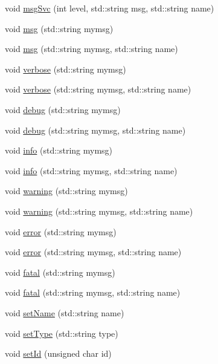 \begin{DoxyCompactItemize}
\item 
void \hyperlink{classObject_a3f9d5537ebce0c0f2bf6ae4d92426f3c}{msgSvc} (int level, std::string msg, std::string name)
\item 
void \hyperlink{classObject_a58b2d0618c2d08cf2383012611528d97}{msg} (std::string mymsg)
\item 
void \hyperlink{classObject_ac5d59299273cee27aacf7de00d2e7034}{msg} (std::string mymsg, std::string name)
\item 
void \hyperlink{classObject_a83d2db2df682907ea1115ad721c1c4a1}{verbose} (std::string mymsg)
\item 
void \hyperlink{classObject_a2d4120195317e2a3c6532e8bb9f3da68}{verbose} (std::string mymsg, std::string name)
\item 
void \hyperlink{classObject_aac010553f022165573714b7014a15f0d}{debug} (std::string mymsg)
\item 
void \hyperlink{classObject_a6c9a0397ca804e04d675ed05683f5420}{debug} (std::string mymsg, std::string name)
\item 
void \hyperlink{classObject_a644fd329ea4cb85f54fa6846484b84a8}{info} (std::string mymsg)
\item 
void \hyperlink{classObject_a1ca123253dfd30fc28b156f521dcbdae}{info} (std::string mymsg, std::string name)
\item 
void \hyperlink{classObject_a65cd4fda577711660821fd2cd5a3b4c9}{warning} (std::string mymsg)
\item 
void \hyperlink{classObject_a11f101db4dd73d9391b0231818881d86}{warning} (std::string mymsg, std::string name)
\item 
void \hyperlink{classObject_a204a95f57818c0f811933917a30eff45}{error} (std::string mymsg)
\item 
void \hyperlink{classObject_ad7f6c457733082efa2f9ff5f5c8e119a}{error} (std::string mymsg, std::string name)
\item 
void \hyperlink{classObject_aad5a16aac7516ce65bd5ec02ab07fc80}{fatal} (std::string mymsg)
\item 
void \hyperlink{classObject_ae62acd3d09f716220f75f252dc38bc9a}{fatal} (std::string mymsg, std::string name)
\item 
void \hyperlink{classObject_ae30fea75683c2d149b6b6d17c09ecd0c}{setName} (std::string name)
\item 
void \hyperlink{classObject_aae534cc9d982bcb9b99fd505f2e103a5}{setType} (std::string type)
\item 
void \hyperlink{classObject_a398fe08cba594a0ce6891d59fe4f159f}{setId} (unsigned char id)

\end{DoxyCompactItemize}

